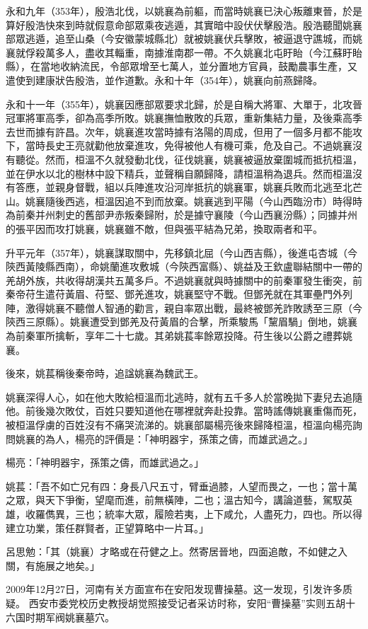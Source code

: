 永和九年（353年），殷浩北伐，以姚襄為前軀，而當時姚襄已決心叛離東晉，於是算好殷浩快來到時就假意命部眾乘夜逃遁，其實暗中設伏伏擊殷浩。殷浩聽聞姚襄部眾逃遁，追至山桑（今安徽蒙城縣北）就被姚襄伏兵擊敗，被逼退守譙城，而姚襄就俘殺萬多人，盡收其輜重，南據淮南郡一帶。不久姚襄北屯盱眙（今江蘇盱眙縣），在當地收納流民，令部眾增至七萬人，並分置地方官員，鼓勵農事生產，又遣使到建康狀告殷浩，並作道歉。永和十年（354年），姚襄向前燕歸降。

永和十一年（355年），姚襄因應部眾要求北歸，於是自稱大將軍、大單于，北攻晉冠軍將軍高季，卻為高季所敗。姚襄撫恤散敗的兵眾，重新集結力量，及後乘高季去世而據有許昌。次年，姚襄進攻當時據有洛陽的周成，但用了一個多月都不能攻下，當時長史王亮就勸他放棄進攻，免得被他人有機可乘，危及自己。不過姚襄沒有聽從。然而，桓溫不久就發動北伐，征伐姚襄，姚襄被逼放棄圍城而抵抗桓溫，並在伊水以北的樹林中設下精兵，並聲稱自願歸降，請桓溫稍為退兵。然而桓溫沒有答應，並親身督戰，組以兵陣進攻沿河岸抵抗的姚襄軍，姚襄兵敗而北逃至北芒山。姚襄隨後西逃，桓溫因追不到而放棄。姚襄逃到平陽（今山西臨汾市）時得時為前秦并州刺史的舊部尹赤叛秦歸附，於是據守襄陵（今山西襄汾縣）；同據并州的張平因而攻打姚襄，姚襄雖不敵，但與張平結為兄弟，換取兩者和平。

升平元年（357年），姚襄謀取關中，先移鎮北屈（今山西吉縣），後進屯杏城（今陝西黃陵縣西南），命姚蘭進攻敷城（今陝西富縣）、姚益及王欽盧聯結關中一帶的羌胡外族，共收得胡漢共五萬多戶。不過姚襄就與時據關中的前秦軍發生衝突，前秦帝苻生遣苻黃眉、苻堅、鄧羌進攻，姚襄堅守不戰。但鄧羌就在其軍壘門外列陣，激得姚襄不聽僧人智通的勸言，親自率眾出戰，最終被鄧羌詐敗誘至三原（今陝西三原縣）。姚襄遭受到鄧羌及苻黃眉的合擊，所乘駿馬「黧眉騧」倒地，姚襄為前秦軍所擒斬，享年二十七歲。其弟姚萇率餘眾投降。苻生後以公爵之禮葬姚襄。

後來，姚萇稱後秦帝時，追諡姚襄為魏武王。

姚襄深得人心，如在他大敗給桓溫而北逃時，就有五千多人於當晚拋下妻兒去追隨他。前後幾次敗仗，百姓只要知道他在哪裡就奔赴投靠。當時謠傳姚襄重傷而死，被桓溫俘虜的百姓沒有不痛哭流涕的。姚襄部屬楊亮後來歸降桓溫，桓溫向楊亮詢問姚襄的為人，楊亮的評價是：「神明器宇，孫策之儔，而雄武過之。」

楊亮：「神明器宇，孫策之儔，而雄武過之。」

姚萇：「吾不如亡兄有四：身長八尺五寸，臂垂過膝，人望而畏之，一也；當十萬之眾，與天下爭衡，望麾而進，前無橫陣，二也；溫古知今，講論道藝，駕馭英雄，收羅儁異，三也；統率大眾，履險若夷，上下咸允，人盡死力，四也。所以得建立功業，策任群賢者，正望算略中一片耳。」

呂思勉：「其（姚襄）才略或在苻健之上。然寄居晉地，四面追敵，不如健之入關，有施展之地矣。」

2009年12月27日，河南有关方面宣布在安阳发现曹操墓。这一发现，引发许多质疑。 西安市委党校历史教授胡觉照接受记者采访时称，安阳“曹操墓”实则五胡十六国时期军阀姚襄墓穴。







